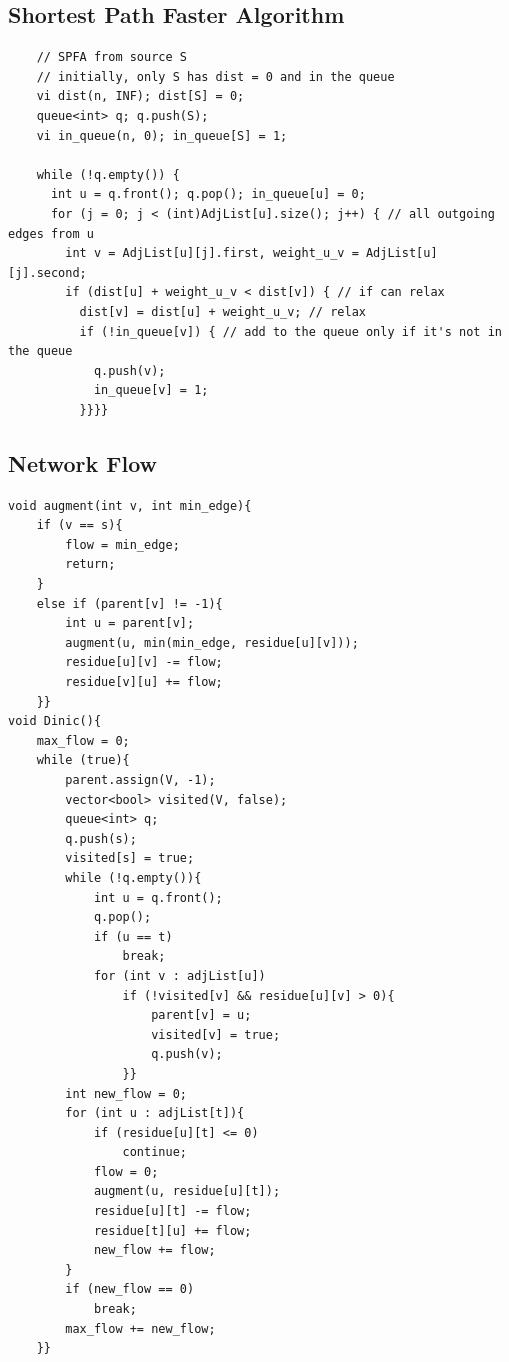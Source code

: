 \documentclass[10pt,landscape]{article}
\begin{document}
\begin{multicols}{2}
\subsection{Shortest Path Faster Algorithm}
\begin{lstlisting}
    // SPFA from source S
    // initially, only S has dist = 0 and in the queue
    vi dist(n, INF); dist[S] = 0;
    queue<int> q; q.push(S);
    vi in_queue(n, 0); in_queue[S] = 1;

    while (!q.empty()) {
      int u = q.front(); q.pop(); in_queue[u] = 0;
      for (j = 0; j < (int)AdjList[u].size(); j++) { // all outgoing edges from u
        int v = AdjList[u][j].first, weight_u_v = AdjList[u][j].second;
        if (dist[u] + weight_u_v < dist[v]) { // if can relax
          dist[v] = dist[u] + weight_u_v; // relax
          if (!in_queue[v]) { // add to the queue only if it's not in the queue
            q.push(v);
            in_queue[v] = 1;
          }}}}
\end{lstlisting}

\subsection{Network Flow}
\begin{lstlisting}
void augment(int v, int min_edge){
    if (v == s){
        flow = min_edge;
        return;
    }
    else if (parent[v] != -1){
        int u = parent[v];
        augment(u, min(min_edge, residue[u][v]));
        residue[u][v] -= flow;
        residue[v][u] += flow;
    }}
void Dinic(){
    max_flow = 0;
    while (true){
        parent.assign(V, -1);
        vector<bool> visited(V, false);
        queue<int> q;
        q.push(s);
        visited[s] = true;
        while (!q.empty()){
            int u = q.front();
            q.pop();
            if (u == t)
                break;
            for (int v : adjList[u])
                if (!visited[v] && residue[u][v] > 0){
                    parent[v] = u;
                    visited[v] = true;
                    q.push(v);
                }}
        int new_flow = 0;
        for (int u : adjList[t]){
            if (residue[u][t] <= 0)
                continue;
            flow = 0;
            augment(u, residue[u][t]);
            residue[u][t] -= flow;
            residue[t][u] += flow;
            new_flow += flow;
        }
        if (new_flow == 0)
            break;
        max_flow += new_flow; 
    }}
\end{lstlisting}


\end{multicols}
\end{document}
